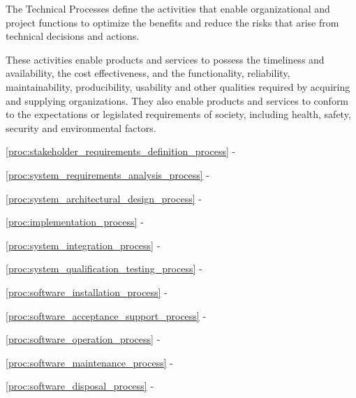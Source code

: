 		\begin{adjustwidth}{1em}{0pt}

			The Technical Processes define the activities that enable organizational and project functions to optimize the benefits and reduce the risks that arise from technical decisions and actions. 

			These activities enable products and services to possess the timeliness and availability, the cost effectiveness, and the functionality, reliability, maintainability, producibility, usability and other qualities required by acquiring and supplying organizations. They also enable products and services to conform to the expectations or legislated requirements of society, including health, safety, security and environmental factors.

			\begin{compactitem}
			
				\item \ref{proc:stakeholder_requirements_definition_process} - 

				\item \ref{proc:system_requirements_analysis_process} - 

				\item \ref{proc:system_architectural_design_process} - 

				\item \ref{proc:implementation_process} - 

				\item \ref{proc:system_integration_process} - 

				\item \ref{proc:system_qualification_testing_process} - 

				\item \ref{proc:software_installation_process} - 

				\item \ref{proc:software_acceptance_support_process} - 

				\item \ref{proc:software_operation_process} - 

				\item \ref{proc:software_maintenance_process} - 

				\item \ref{proc:software_disposal_process} - 
			
			\end{compactitem}

		\end{adjustwidth}


